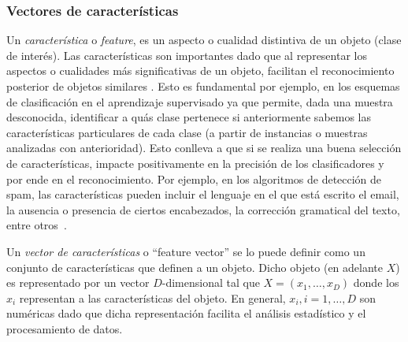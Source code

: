 \subsubsection{Vectores de características} \label{subsection:feature}

	Un \textit{característica} o \textit{feature}, es un aspecto o cualidad distintiva de un objeto (clase de interés). Las características son importantes dado que al representar los aspectos o cualidades más significativas de un objeto, facilitan el reconocimiento posterior de objetos similares \cite{OIVIND95}. Esto es fundamental por ejemplo, en los esquemas de clasificación en el aprendizaje supervisado ya que permite, dada una muestra desconocida, identificar a quás clase pertenece si anteriormente sabemos las características particulares de cada clase (a partir de instancias o muestras analizadas con anterioridad). Esto conlleva a que si se realiza una buena selección de características, impacte positivamente en la precisión de los clasificadores y por ende en el reconocimiento. Por ejemplo, en los algoritmos de detección de spam, las características pueden incluir el lenguaje en el que está escrito el email, la ausencia o presencia de ciertos encabezados, la corrección gramatical del texto, entre otros~\cite{SpamPaper}.

	Un \textit{vector de características} o ``feature vector'' se lo puede definir como un conjunto de características que definen a un objeto. Dicho objeto (en adelante $X$) es representado por un vector $D$-dimensional tal que  $X=(x_1,\dots,x_D)$ donde los $x_i$ representan a las características del objeto. En general, $x_i, i=1,\dots,D$ son numéricas dado que dicha representación facilita el análisis estadístico y el procesamiento de datos.

		
	
